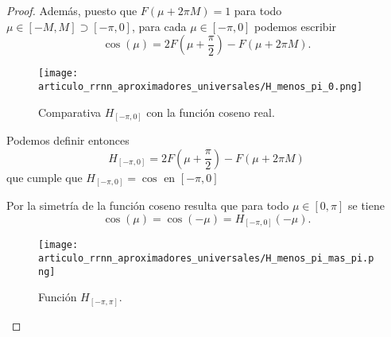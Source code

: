 \begin{proof}
    Además, puesto que $F(\mu + 2 \pi M) = 1$ para todo $\mu \in [-M, M] \supset [-\pi, 0]$,
    para cada $\mu \in [-\pi, 0]$ podemos escribir
    \begin{equation}
        \cos(\mu) = 
        2 F \left(\mu + \frac{\pi}{2} \right)  - F(\mu + 2 \pi M). 
    \end{equation}

    \begin{figure}[h]
        \centering
        \texttt{[image: articulo\_rrnn\_aproximadores\_universales/H\_menos\_pi\_0.png]}
        \caption{Comparativa $H_{[-\pi, 0]}$ con la función coseno real. }
        \label{fig:coseno_vs_H_menos_pi_cero}
    \end{figure}

    Podemos definir entonces
    \begin{equation}
        H_{[-\pi, 0]} = 2 F \left(\mu + \frac{\pi}{2} \right)  - F(\mu + 2 \pi M) 
    \end{equation}
    que cumple que $H_{[-\pi, 0]} = \cos$ en $[-\pi,0]$

    Por la simetría de la función coseno resulta que 
    para todo $\mu \in [0, \pi]$ se tiene
    \begin{equation}
        \cos(\mu) = \cos(-\mu) = H_{[-\pi, 0]}(-\mu).
    \end{equation}
    \begin{figure}[h]
        \centering
        \texttt{[image: articulo\_rrnn\_aproximadores\_universales/H\_menos\_pi\_mas\_pi.png]}
        \caption{Función $H_{[-\pi, \pi]}$. }
        \label{fig:H_menos_pi_mas_pi}
    \end{figure}


\end{proof}
